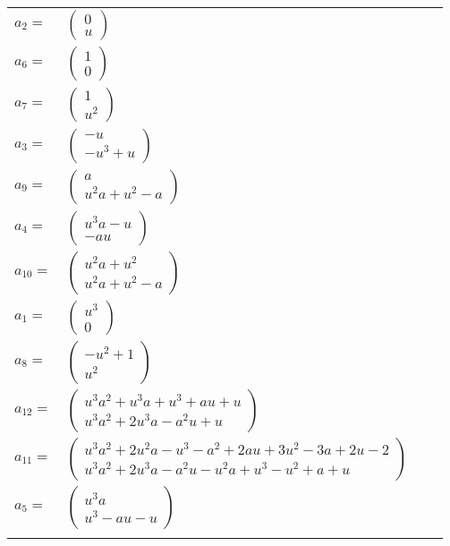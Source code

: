 \documentclass[1p]{elsarticle_modified}
\theoremstyle{definition}
\begin{document}
\begin{tabular}{m{7pt} m{180pt} m{7pt} m{180pt} }
\flushright $a_{2}=$&$\begin{pmatrix}0\\u\end{pmatrix}$ \\
\flushright $a_{6}=$&$\begin{pmatrix}1\\0\end{pmatrix}$ \\
\flushright $a_{7}=$&$\begin{pmatrix}1\\u^2\end{pmatrix}$ \\
\flushright $a_{3}=$&$\begin{pmatrix}- u\\- u^3+u\end{pmatrix}$ \\
\flushright $a_{9}=$&$\begin{pmatrix}a\\u^2 a+u^2- a\end{pmatrix}$ \\
\flushright $a_{4}=$&$\begin{pmatrix}u^3 a- u\\- a u\end{pmatrix}$ \\
\flushright $a_{10}=$&$\begin{pmatrix}u^2 a+u^2\\u^2 a+u^2- a\end{pmatrix}$ \\
\flushright $a_{1}=$&$\begin{pmatrix}u^3\\0\end{pmatrix}$ \\
\flushright $a_{8}=$&$\begin{pmatrix}- u^2+1\\u^2\end{pmatrix}$ \\
\flushright $a_{12}=$&$\begin{pmatrix}u^3 a^2+u^3 a+u^3+a u+u\\u^3 a^2+2 u^3 a- a^2 u+u\end{pmatrix}$ \\
\flushright $a_{11}=$&$\begin{pmatrix}u^3 a^2+2 u^2 a- u^3- a^2+2 a u+3 u^2-3 a+2 u-2\\u^3 a^2+2 u^3 a- a^2 u- u^2 a+u^3- u^2+a+u\end{pmatrix}$ \\
\flushright $a_{5}=$&$\begin{pmatrix}u^3 a\\u^3- a u- u\end{pmatrix}$\\&\end{tabular}
\end{document}
